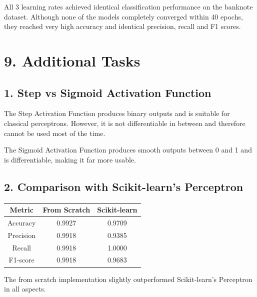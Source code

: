 \documentclass[11pt]{article}
\begin{document}
\vspace{3mm}

All 3 learning rates achieved identical classification performance on the banknote dataset. Although none of the models completely converged within 40 epochs, they reached very high accuracy and identical precision, recall and F1 scores.


\section*{9. Additional Tasks}

\subsection*{1. Step vs Sigmoid Activation Function}

The Step Activation Function produces binary outputs and is suitable for classical perceptrons. However, it is not differentiable in between and therefore cannot be used most of the time.

The Sigmoid Activation Function produces smooth outputs between 0 and 1 and is differentiable, making it far more usable.

\vspace{5mm}

\subsection*{2. Comparison with Scikit-learn's Perceptron}

\begin{center}
\begin{tabular}{|c|c|c|}
\hline
Metric & From Scratch & Scikit-learn\\
\hline
Accuracy & 0.9927 & 0.9709\\
\hline
Precision & 0.9918 & 0.9385\\
\hline
Recall & 0.9918 & 1.0000\\
\hline
F1-score & 0.9918 & 0.9683\\
\hline
\end{tabular}
\end{center}

The from scratch implementation slightly outperformed Scikit-learn's Perceptron in all aspects.

\vspace{5mm}
\end{document}
